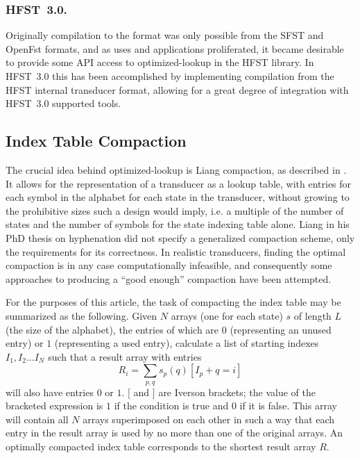 \documentclass{llncs}
\begin{document}
\subsubsection{HFST~3.0.}
Originally compilation to the format was only possible from the SFST and OpenFst
formats, and as uses and applications proliferated, it became desirable to
provide some API access to optimized-lookup in the HFST library. In HFST~3.0
this has been accomplished by implementing compilation from the HFST internal
transducer format, allowing for a great degree of integration with
HFST~3.0 supported tools.

\subsection{Index Table Compaction}
The crucial idea behind optimized-lookup is Liang compaction, as described in
\cite{silfverberg/2009}. It allows for the representation of a transducer as
a lookup table, with entries for each symbol in the alphabet for each state
in the transducer, without growing to the prohibitive sizes such a design
would imply, i.e. a multiple of the number of states and the number of symbols for
the state indexing table alone. Liang in his PhD thesis on hyphenation
\cite{liang/1983} did not specify a generalized compaction scheme, only the
requirements for its correctness. In realistic transducers, finding the optimal
compaction is in any case computationally infeasible, and consequently some approaches to
producing a ``good enough'' compaction have been attempted.

For the purposes of this article, the task of compacting the index table may
be summarized as the following. Given $N$ arrays (one for each state) $s$ of
length $L$ (the size of the alphabet), the
entries of which are $0$ (representing an unused entry) or $1$ (representing a
used entry), calculate a list of starting indexes $I_1, I_2 \ldots I_N$ such
that a result array with entries
\begin{equation}
R_i = \displaystyle\sum\limits_{p, q} s_p(q) [I_p + q = i]
\end{equation} will also have
entries $0$ or $1$. $[$ and $]$ are Iverson brackets; the value of the bracketed
expression is $1$ if the condition is true and $0$ if it is false. This
array will contain all $N$ arrays superimposed on each other in such a way
that each entry in the result array is used by no more than one of the original
arrays. An optimally compacted index table corresponds to the shortest result
array $R$.
\end{document}
